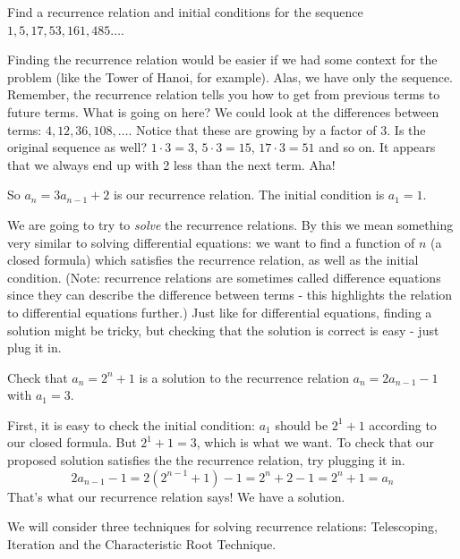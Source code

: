 \documentclass[12pt]{article}
\begin{document}
\begin{example}
  Find a recurrence relation and initial conditions for the sequence $1, 5, 17, 53, 161, 485\ldots$. 
  \begin{solution}
    Finding the recurrence relation would be easier if we had some context for the problem (like the Tower of Hanoi, for example).  Alas, we have only the sequence.  Remember, the recurrence relation tells you how to get from previous terms to future terms.  What is going on here?  We could look at the differences between terms: $4, 12, 36, 108, \ldots$.  Notice that these are growing by a factor of 3.  Is the original sequence as well?  $1\cdot 3 = 3$, $5 \cdot 3 = 15$, $17 \cdot 3 = 51$ and so on.  It appears that we always end up with 2 less than the next term.  Aha!  
    
    So $a_n = 3a_{n-1} + 2$ is our recurrence relation.  The initial condition is $a_1 = 1$.
  \end{solution}

\end{example}

 
We are going to try to {\em solve} the recurrence relations.  By this we mean something very similar to solving differential equations: we want to find a function of $n$ (a closed formula) which satisfies the recurrence relation, as well as the initial condition.  (Note: recurrence relations are sometimes called difference equations since they can describe the difference between terms - this highlights the relation to differential equations further.) Just like for differential equations, finding a solution might be tricky, but checking that the solution is correct is easy - just plug it in.
 
 \begin{example}
    Check that $a_n = 2^n + 1$ is a solution to the recurrence relation $a_n = 2a_{n-1} - 1$ with $a_1 = 3$. 
    \begin{solution}
      First, it is easy to check the initial condition: $a_1$ should be $2^1 + 1$ according to our closed formula.  But $2^1 + 1 = 3$, which is what we want.  To check that our proposed solution satisfies the the recurrence relation, try plugging it in.
      \[2a_{n-1} - 1 = 2(2^{n-1} + 1) - 1 = 2^n + 2 - 1 = 2^n +1 = a_n\]
      That's what our recurrence relation says!  We have a solution.
    \end{solution}

 \end{example}

 
We will consider three techniques for solving recurrence relations: Telescoping, Iteration and the Characteristic Root Technique.
\end{document}
